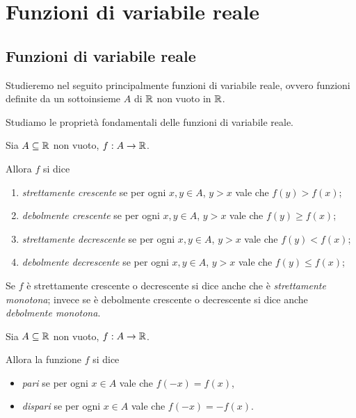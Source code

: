 \chapter{Funzioni di variabile reale}

\section{Funzioni di variabile reale}

Studieremo nel seguito principalmente funzioni di variabile reale, ovvero funzioni definite da un sottoinsieme $A$ di $\mathbb{R}$ non vuoto in $\mathbb{R}$.

Studiamo le proprietà fondamentali delle funzioni di variabile reale.

\begin{definition} 
    Sia $A \subseteq \mathbb{R}$ non vuoto, $f : A \to \mathbb{R}$.
    
    Allora $f$ si dice
    \begin{enumerate}[label=(\arabic*)]
        \item \emph{strettamente crescente} se per ogni $x, y \in A$, $y > x$ vale che $f(y) > f(x)$;
        \item \emph{debolmente crescente} se per ogni $x, y \in A$, $y > x$ vale che $f(y) \geq f(x)$;
        \item \emph{strettamente decrescente} se per ogni $x, y \in A$, $y > x$ vale che $f(y) < f(x)$;
        \item \emph{debolmente decrescente} se per ogni $x, y \in A$, $y > x$ vale che $f(y) \leq f(x)$;
    \end{enumerate}
    
    Se $f$ è strettamente crescente o decrescente si dice anche che è \emph{strettamente monotona}; invece se è debolmente crescente o decrescente si dice anche \emph{debolmente monotona}.
\end{definition}

\begin{definition}
    Sia $A \subseteq \mathbb{R}$ non vuoto, $f : A \to \mathbb{R}$.

    Allora la funzione $f$ si dice \begin{itemize}
        \item \emph{pari} se per ogni $x \in A$ vale che $f(-x) = f(x)$,
        \item \emph{dispari} se per ogni $x \in A$ vale che $f(-x) = -f(x)$.
    \end{itemize}
\end{definition}

